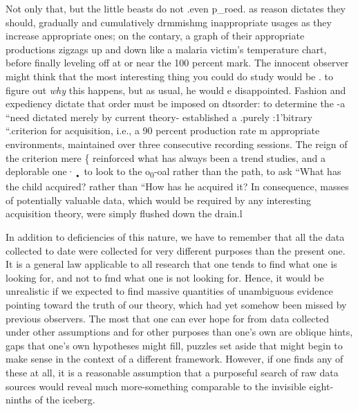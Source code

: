 Not only that, but the little beasts do not .even p\_roed. as
reason dictates they should, gradually and cumulatively drmmishmg inappropriate usages as they increase appropriate ones; on the contary, a graph of their appropriate productions zigzags up and down like a malaria victim's temperature chart, before finally leveling off at or near the 100 percent mark. The innocent observer might think that the most interesting thing you could do  study would be . to figure out \textit{why} this happens, but as usual, he would e disappointed. Fashion and expediency dictate that order must be imposed on dts\-order: to determine the -a ``need dictated merely by current theory{}-\citet{Brown1973} established a .purely :1'bitrary ``.cri\-terion for acquisition, i.e., a 90 percent production rate m appropriate environments, maintained over three consecutive recording sessions. The reign of the criterion mere \{ reinforced what has always been
a trend  studies, and a deplorable one·\textsubscript{•}\textsubscript{ }to look to the o\textsubscript{0}{}-oal rather than the path, to ask ``What has the child acquired? rather than
``How has he acquired it? In consequence, masses of potentially valuable data, which would be required by any interesting acquisition theory, were simply flushed down the drain.l

In addition to deficiencies of this nature, we have to remember that all the data collected to date were collected for very different purposes than the present one. It is a general law applicable to all research that one tends to find what one is looking for, and not to fmd what one is not looking for. Hence, it would be unrealistic if we expected to find massive quantities of unambiguous evidence pointing toward the truth of our theory, which had yet somehow been missed by previous observers. The most that one can ever hope for from data collected under other assumptions and for other purposes than one's own are oblique hints, gaps that one's own hypotheses might fill, puzzles set aside that might begin to make sense in the context of a different framework. However, if one finds any of these at all, it is a reasonable assumption that a purposeful search of raw data sources would reveal much more-something comparable to the invisible eight-ninths of the iceberg.

